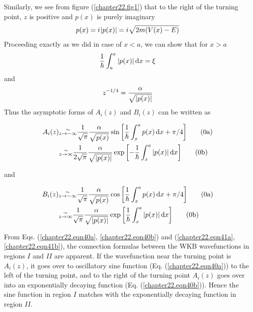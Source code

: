 Similarly, we see from figure (\ref{chapter22.fig1}) that to the right of the turning point, $z$ is positive and $p(x)$ is purely imaginary
\begin{equation}
p(x)  = {i\mkern1mu} \abs{p(x)} = {i\mkern1mu} \sqrt{2 m \qty(V(x) - E)}
\end{equation}
Proceeding exactly as we did in case of $x<a$, we can show that for $x>a$
\begin{equation}
\label{chapter22.eqn38}
\frac{1}{\hbar} \int_{a}^{x} \abs{p(x)} \dd{x} = \xi
\end{equation}
and
\begin{equation}
\label{chapter22.eqn39}
z^{-1/4} = \frac{\alpha}{\sqrt{\abs{p(x)}}}
\end{equation}
Thus the asymptotic forms of $A_i(z)$ and $B_i(z)$ can be written as


\begin{align}
	A_i(z) 
	&\substack{\sim \\ z \rightarrow -\infty} \frac{1}{\sqrt{\pi}} \frac{\alpha}{\sqrt{p(x)}} \sin \qty[\frac{1}{\hbar} \int_{x}^{a} p(x) \dd{x} + \pi/4]
	\label{chapter22.eqn40a}
	\tag{\theequation a}
	 \\
	&\substack{\sim \\ z \rightarrow \infty} \frac{1}{2\sqrt{\pi}} \frac{\alpha}{\sqrt{\abs{p(x)}}} \exp \qty[-\frac{1}{\hbar} \int_{x}^{a} \abs{p(x)} \dd{x}]
	\label{chapter22.eqn40b}
	\tag{\theequation b}
\end{align}


and

\begin{align}
B_i(z) 
&\substack{\sim \\ z \rightarrow -\infty} \frac{1}{\sqrt{\pi}} \frac{\alpha}{\sqrt{p(x)}} \cos \qty[\frac{1}{\hbar} \int_{x}^{a} p(x) \dd{x} + \pi/4]
\label{chapter22.eqn41a}
\tag{\theequation a} \\
&\substack{\sim \\ z \rightarrow \infty} \frac{1}{\sqrt{\pi}} \frac{\alpha}{\sqrt{\abs{p(x)}}} \exp \qty[\frac{1}{\hbar} \int_{x}^{a} \abs{p(x)} \dd{x}]
\label{chapter22.eqn41b}
\tag{\theequation b}
\end{align}

From Eqs. (\ref{chapter22.eqn40a}, \ref{chapter22.eqn40b}) and (\ref{chapter22.eqn41a}, \ref{chapter22.eqn41b}), the connection formulas between the WKB wavefunctions in regions $I$ and $II$ are apparent. If the wavefunction near the turning point is $A_i(z)$, it goes over to oscillatory sine function (Eq. (\ref{chapter22.eqn40a})) to the left of the turning point, and to the right of the turning point $A_i(z)$
goes over into an exponentially decaying function (Eq. (\ref{chapter22.eqn40b})). Hence the sine function in region $I$ matches with the exponentially decaying function in region $II$.\\

